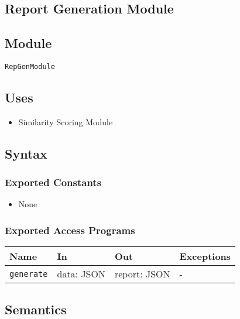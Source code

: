 \documentclass[12pt, titlepage]{article}
\begin{document}
\begin{itemize}

\section{Report Generation Module} \label{mReport}

\subsection{Module}

\texttt{RepGenModule}

\subsection{Uses}

\begin{itemize}
    \item Similarity Scoring Module
\end{itemize}

\subsection{Syntax}

\subsubsection{Exported Constants}

\begin{itemize}
    \item None
\end{itemize}

\subsubsection{Exported Access Programs}

\begin{center}
\begin{tabular}{p{5cm} p{3.5cm} p{3.5cm} p{2cm}}
\hline
\textbf{Name} & \textbf{In} & \textbf{Out} & \textbf{Exceptions} \\
\hline
\texttt{generate} & data: JSON & report: JSON & -\\
\hline
\end{tabular}
\end{center}

\subsection{Semantics}


\end{itemize}
\end{document}
